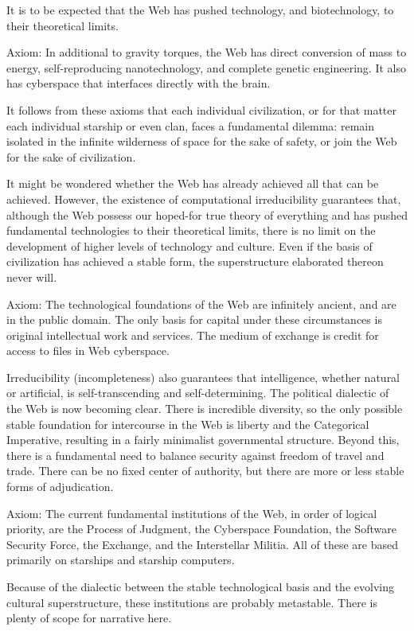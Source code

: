 \documentclass[english,11pt,letterpaper,onecolumn]{scrbook}
\begin{document}
It is to be expected that the Web has pushed technology, and biotechnology, to their theoretical limits.

Axiom:	In additional to gravity torques, the Web has direct conversion of mass to energy, self-reproducing nanotechnology, and complete genetic engineering.  It also has cyberspace that interfaces directly with the brain.

It follows from these axioms that each individual civilization, or for that matter each individual starship or even clan, faces a fundamental dilemma:  remain isolated in the infinite wilderness of space for the sake of safety, or join the Web for the sake of civilization.

It might be wondered whether the Web has already achieved all that can be achieved.  However, the existence of computational irreducibility guarantees that, although the Web possess our hoped-for true theory of everything and has pushed fundamental technologies to their theoretical limits, there is no limit on the development of higher levels of technology and culture.  Even if the basis of civilization has achieved a stable form, the superstructure elaborated thereon never will.

Axiom:	The technological foundations of the Web are infinitely ancient, and are in the public domain.  The only basis for capital under these circumstances is original intellectual work and services.  The medium of exchange is credit for access to files in Web cyberspace.

Irreducibility (incompleteness) also guarantees that intelligence, whether natural or artificial, is self-transcending and self-determining.  The political dialectic of the Web is now becoming clear.  There is incredible diversity, so the only possible stable foundation for intercourse in the Web is liberty and the Categorical Imperative, resulting in a fairly minimalist governmental structure.  Beyond this, there is a fundamental need to balance security against freedom of travel and trade.  There can be no fixed center of authority, but there are more or less stable forms of adjudication.

Axiom:	The current fundamental institutions of the Web, in order of logical priority, are the Process of Judgment, the Cyberspace Foundation, the Software Security Force, the Exchange, and the Interstellar Militia.  All of these are based primarily on starships and starship computers.

Because of the dialectic between the stable technological basis and the evolving cultural superstructure, these institutions are probably metastable.  There is plenty of scope for narrative here.
\end{document}
